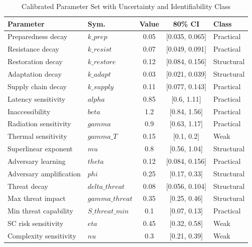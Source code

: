\begin{table}[!t]
\centering
\caption{Calibrated Parameter Set with Uncertainty and Identifiability Class}
\label{tab:params_live}
\scriptsize
\renewcommand{\arraystretch}{1.1}
\begin{tabular}{llccl}
\toprule
\textbf{Parameter} & \textbf{Sym.} & \textbf{Value} & \textbf{80\% CI} & \textbf{Class} \\
\midrule
Preparedness decay & $k\_prep$ & 0.05 & [0.035, 0.065] & Practical \\
Resistance decay & $k\_resist$ & 0.07 & [0.049, 0.091] & Practical \\
Restoration decay & $k\_restore$ & 0.12 & [0.084, 0.156] & Structural \\
Adaptation decay & $k\_adapt$ & 0.03 & [0.021, 0.039] & Structural \\
Supply chain decay & $k\_supply$ & 0.11 & [0.077, 0.143] & Practical \\
Latency sensitivity & $alpha$ & 0.85 & [0.6, 1.11] & Practical \\
Inaccessibility & $beta$ & 1.2 & [0.84, 1.56] & Practical \\
Radiation sensitivity & $gamma$ & 0.9 & [0.63, 1.17] & Practical \\
Thermal sensitivity & $gamma\_T$ & 0.15 & [0.1, 0.2] & Weak \\
Superlinear exponent & $mu$ & 0.8 & [0.56, 1.04] & Structural \\
Adversary learning & $theta$ & 0.12 & [0.084, 0.156] & Practical \\
Adversary amplification & $phi$ & 0.25 & [0.17, 0.33] & Structural \\
Threat decay & $delta\_threat$ & 0.08 & [0.056, 0.104] & Structural \\
Max threat impact & $gamma\_threat$ & 0.35 & [0.25, 0.46] & Structural \\
Min threat capability & $S\_threat\_min$ & 0.1 & [0.07, 0.13] & Practical \\
SC risk sensitivity & $eta$ & 0.45 & [0.32, 0.58] & Weak \\
Complexity sensitivity & $nu$ & 0.3 & [0.21, 0.39] & Weak \\
\bottomrule
\end{tabular}
\end{table}
